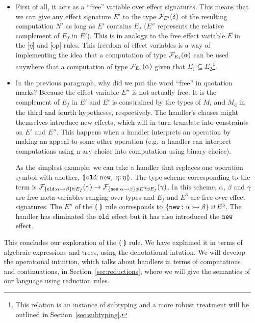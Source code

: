 \begin{itemize}
\item First of all, it acts as a ``free'' variable over effect
  signatures. This means that we can give any effect signature $E'$ to the
  type $\mathcal{F}_{E'}(\delta)$ of the resulting computation $N'$ as long as $E'$
  contains $E_f$ ($E''$ represents the relative complement of $E_f$ in
  $E'$). This is in analogy to the free effect variable $E$ in the [$\eta$]
  and [op] rules. This freedom of effect variables is a way of implementing
  the idea that a computation of type $\mathcal{F}_{E_1}(\alpha)$ can be used
  anywhere that a computation of type $\mathcal{F}_{E_2}(\alpha)$ given that $E_1
  \subseteq E_2$\footnote{This relation is an instance of subtyping and a
    more robust treatment will be outlined in Section~\ref{sec:subtyping}.}.

\item In the previous paragraph, why did we put the word ``free'' in
  quotation marks?  Because the effect variable $E''$ is not actually
  free. It is the complement of $E_f$ in $E'$ and $E'$ is constrained by
  the types of $M_i$ and $M_\eta$ in the third and fourth hypotheses,
  respectively. The handler's clauses might themselves introduce new
  effects, which will in turn translate into constraints on $E'$ and
  $E''$. This happens when a handler interprets an operation by making an
  appeal to some other operation (e.g.\ a handler can interpret
  computations using n-ary choice into computation using binary choice).

  As the simplest example, we can take a handler that replaces one
  operation symbol with another,
  $\banana{\onto{\op{old}} \op{new},\ \onto{\eta} \eta}$. The type scheme
  corresponding to the term is $\mathcal{F}_{\{\mathtt{old} : \alpha \rightarrowtail \beta\}
    \uplus E_f}(\gamma) \to \mathcal{F}_{\{\mathtt{new} : \alpha \rightarrowtail \beta\} \uplus
    E^3 \uplus E_f}(\gamma)$. In this scheme, $\alpha$, $\beta$ and
  $\gamma$ are free meta-variables ranging over types and $E_f$ and $E^3$
  are free over effect signatures. The $E''$ of the $\llparenthesis \,  \, \rrparenthesis$ rule
  corresponds to $\{\mathtt{new} : \alpha \rightarrowtail \beta\} \uplus E^3$. The handler
  has eliminated the $\mathtt{old}$ effect but it has also introduced the
  $\mathtt{new}$ effect.
\end{itemize}

This concludes our exploration of the $\llparenthesis \,  \, \rrparenthesis$ rule. We have explained
it in terms of algebraic expressions and trees, using the denotational
intution. We will develop the operational intuition, which talks about
handlers in terms of computations and continuations, in
Section~\ref{sec:reductions}, where we will give the semantics of our
language using reduction rules.

